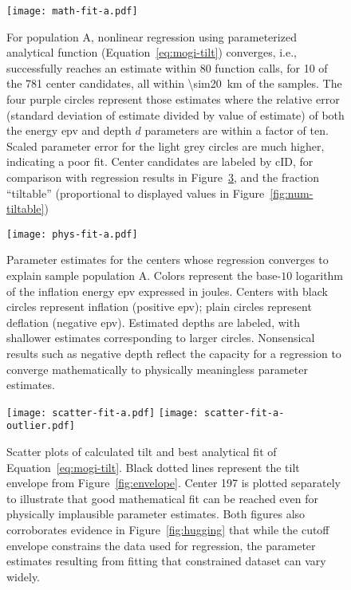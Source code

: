 \begin{figure}
    \texttt{[image: math-fit-a.pdf]}%
    \caption[Population A: Goodness of Fit]{For population A, nonlinear regression using parameterized analytical function (Equation~\eqref{eq:mogi-tilt}) converges, i.e., successfully reaches an estimate within 80 function calls, for 10 of the 781 center candidates, all within \qty{\sim20}{\km} of the samples. The four purple circles represent those estimates where the relative error (standard deviation of estimate divided by value of estimate) of both the energy \acs{epv} and depth $d$ parameters are within a factor of ten. Scaled parameter error for the light grey circles are much higher, indicating a poor fit. Center candidates are labeled by cID, for comparison with regression results in Figure~\ref{fig:scatter-fit-a}, and the fraction ``tiltable'' (proportional to displayed values in Figure~\ref{fig:num-tiltable})}%
    \label{fig:math-fit-a}
\end{figure}

\begin{figure}
    \texttt{[image: phys-fit-a.pdf]}%
    \caption[Population A: Parameter Estimates]{Parameter estimates for the centers whose regression converges to explain sample population A. Colors represent the base-$10$ logarithm of the inflation energy \acs{epv} expressed in joules. Centers with black circles represent inflation (positive \acs{epv}); plain circles represent deflation (negative \acs{epv}). Estimated depths are labeled, with shallower estimates corresponding to larger circles. Nonsensical results such as negative depth reflect the capacity for a regression to converge mathematically to physically meaningless parameter estimates.}%
    \label{fig:phys-fit-a}
\end{figure}

\begin{figure}
    \texttt{[image: scatter-fit-a.pdf]}
    \texttt{[image: scatter-fit-a-outlier.pdf]}
    \caption[Population A: Scatter Plots \& Analytical Fit]{Scatter plots of calculated tilt and best analytical fit of Equation~\eqref{eq:mogi-tilt}. Black dotted lines represent the tilt envelope from Figure~\ref{fig:envelope}. Center 197 is plotted separately to illustrate that good mathematical fit can be reached even for physically implausible parameter estimates. Both figures also corroborates evidence in Figure~\ref{fig:hugging} that while the cutoff envelope constrains the data used for regression, the parameter estimates resulting from fitting that constrained dataset can vary widely.}%
    \label{fig:scatter-fit-a}
\end{figure}

